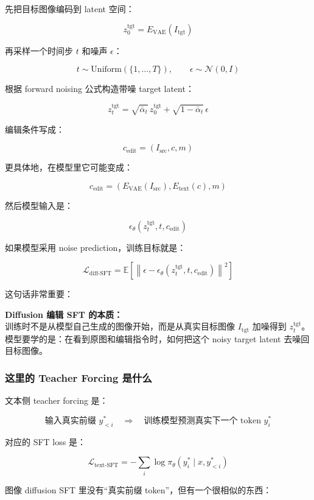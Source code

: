 先把目标图像编码到 latent 空间：

\[
z_0^\text{tgt}
=
E_\text{VAE}(I_\text{tgt})
\]

再采样一个时间步 $t$ 和噪声 $\epsilon$：

\[
t\sim \text{Uniform}(\{1,\ldots,T\}),
\qquad
\epsilon\sim\mathcal{N}(0,I)
\]

根据 forward noising 公式构造带噪 target latent：

\[
z_t^\text{tgt}
=
\sqrt{\bar{\alpha}_t}\,z_0^\text{tgt}
+
\sqrt{1-\bar{\alpha}_t}\,\epsilon
\]

编辑条件写成：

\[
c_\text{edit}
=
\left(
I_\text{src},
c,
m
\right)
\]

更具体地，在模型里它可能变成：

\[
c_\text{edit}
=
\left(
E_\text{VAE}(I_\text{src}),
E_\text{text}(c),
m
\right)
\]

然后模型输入是：

\[
\epsilon_\theta
\left(
z_t^\text{tgt},
t,
c_\text{edit}
\right)
\]

如果模型采用 noise prediction，训练目标就是：

\[
\mathcal{L}_\text{diff-SFT}
=
\mathbb{E}
\left[
\left\|
\epsilon
-
\epsilon_\theta
\left(
z_t^\text{tgt},
t,
c_\text{edit}
\right)
\right\|^2
\right]
\]

这句话非常重要：

\begin{summarybox}
\textbf{Diffusion 编辑 SFT 的本质：}\\
训练时不是从模型自己生成的图像开始，而是从真实目标图像 $I_\text{tgt}$ 加噪得到 $z_t^\text{tgt}$。模型要学的是：在看到原图和编辑指令时，如何把这个 noisy target latent 去噪回目标图像。
\end{summarybox}

\subsubsection{这里的 Teacher Forcing 是什么}

文本侧 teacher forcing 是：

\[
\text{输入真实前缀 } y_{<i}^*
\quad\Rightarrow\quad
\text{训练模型预测真实下一个 token } y_i^*
\]

对应的 SFT loss 是：

\[
\mathcal{L}_\text{text-SFT}
=
-
\sum_i
\log
\pi_\theta
\left(
y_i^*
\mid
x,
y_{<i}^*
\right)
\]

图像 diffusion SFT 里没有“真实前缀 token”，但有一个很相似的东西：

